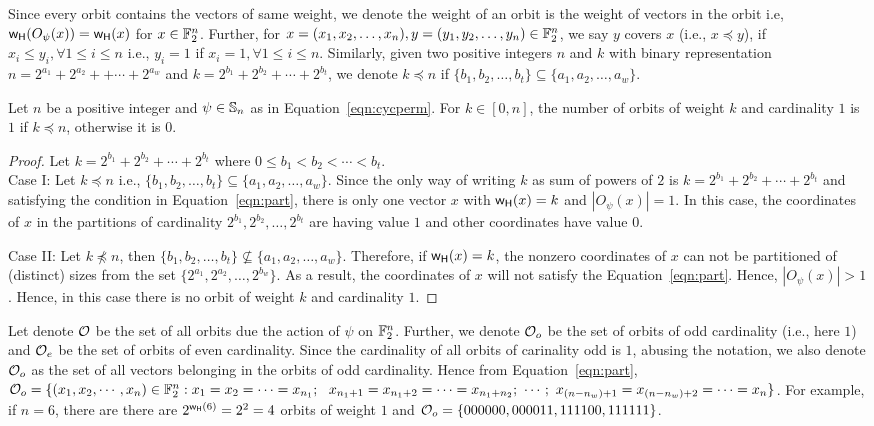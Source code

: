 \documentclass{llncs}
\begin{document}
Since every orbit contains the vectors of same weight, we denote the weight of an orbit is the weight of vectors in the orbit i.e, $\mathsf{w_H}(O_\psi(x)) = \mathsf{w_H}(x)$ for $x \in \mathbb{F}_2^n$. Further, for $x = (x_1, x_2,\ldots, x_n), y = (y_1, y_2, \ldots, y_n) \in \mathbb{F}_2^n$, we say $y$ covers $x$ (i.e., $x \preceq y $), if $x_{i} \leq y_{i}, \forall 1 \leq i \leq n$ i.e., $y_i = 1$ if $x_i = 1, \forall 1 \leq i \leq n$.
Similarly, given two positive integers $n$ and $k$ with binary representation $n = 2^{a_1} + 2^{a_2} + + \cdots + 2^{a_w}$ and $k = 2^{b_1}+ 2^{b_2} + \cdots + 2^{b_t}$, we denote $k \preceq n$ if $\{b_1, b_2, \ldots, b_t\} \subseteq \{a_1, a_2, \ldots, a_w\}$.
\begin{lemma}\label{lem:orbNok}
Let $n$ be a positive integer and $\psi \in \mathbb{S}_n$ as in Equation~\ref{eqn:cycperm}. For $k \in [0,n]$, the number of orbits of weight $k$ and cardinality $1$ is $1$ if $k \preceq n$, otherwise it is $0$.
\end{lemma}
\begin{proof}
Let $k = 2^{b_1}+ 2^{b_2} + \cdots + 2^{b_t}$ where $0 \leq b_1 < b_2 < \cdots < b_t$.\\
Case I: Let $k \preceq n$ i.e., $\{b_1, b_2, \ldots, b_t\} \subseteq \{a_1, a_2, \ldots, a_w\}$. Since the only way of writing $k$ as sum of powers of $2$ is $k = 2^{b_1}+ 2^{b_2} + \cdots + 2^{b_t}$ and satisfying the condition in Equation~\ref{eqn:part}, there is only one vector $x$ with $\mathsf{w_H}(x) = k$ and $|O_\psi(x)| = 1$. In this case, the coordinates of $x$ in the partitions of cardinality $2^{b_1}, 2^{b_2}, \ldots, 2^{b_t}$ are having value $1$ and other coordinates have value $0$.

\noindent Case II: Let $k \not\preceq n$, then $\{b_1, b_2, \ldots, b_t\} \not \subseteq \{a_1, a_2, \ldots, a_w\}$. Therefore, if $\mathsf{w_H}(x) = k$, the nonzero coordinates of $x$ can not be partitioned of (distinct) sizes from the set $\{2^{a_1}, 2^{a_2}, \ldots, 2^{b_w}\}$.
As a result, the coordinates of $x$ will not satisfy the Equation~\ref{eqn:part}. Hence,
$|O_\psi(x)| > 1$. Hence, in this case there is no orbit of weight $k$ and cardinality $1$.
\end{proof}

Let denote $\mathcal{O}$ be the set of all orbits due the action of $\psi$ on $\mathbb{F}_2^n$. Further, we denote $\mathcal{O}_o$ be the set of orbits of odd cardinality (i.e., here $1$) and $\mathcal{O}_e$ be the set of orbits of even cardinality. Since the cardinality of all orbits of carinality odd is $1$, abusing the notation, we also denote $\mathcal{O}_o$ as the set of all vectors belonging in the orbits of odd cardinality. Hence from Equation~\ref{eqn:part}, 
$\mathcal{O}_o = \{(x_1, x_2, \cdots, x_n) \in \mathbb{F}_2^n : x_1 = x_2 = \cdots = x_{n_1};~~ x_{n_1 + 1} = x_{n_1 + 2} = \cdots = x_{n_1 + n_2};~ \cdots ;~ x_{(n- n_w ) + 1} = x_{(n- n_w ) + 2} = \cdots = x_n\}$.
For example, if $n = 6$, there are there are $2^{\mathsf{w_H}(6)} = 2^2 = 4$ orbits of weight $1$ and $\mathcal{O}_o = \{000000, 000011, 111100, 111111\}$. 
\end{document}
